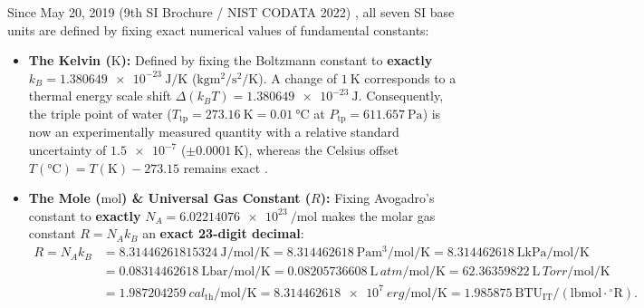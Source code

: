 Since May 20, 2019 (9th SI Brochure / NIST CODATA 2022) , all seven SI base units are defined by fixing exact numerical values of fundamental constants:
\begin{itemize}
  \item \textbf{The Kelvin ($\si{\kelvin}$):} Defined by fixing the Boltzmann constant to \textbf{exactly} $k_B = \SI{1.380649e-23}{\joule\per\kelvin}$ ($\si{\kilogram\square\meter\per\square\second\per\kelvin}$). A change of $\SI{1}{\kelvin}$ corresponds to a thermal energy scale shift $\Delta(k_B T) = \SI{1.380649e-23}{\joule}$. Consequently, the triple point of water ($T_{\mathrm{tp}} = \SI{273.16}{\kelvin} = \SI{0.01}{\celsius}$ at $P_{\mathrm{tp}} = \SI{611.657}{\pascal}$) is now an experimentally measured quantity with a relative standard uncertainty of $\num{1.5e-7}$ ($\pm\SI{0.0001}{\kelvin}$), whereas the Celsius offset $T(\si{\celsius}) = T(\si{\kelvin}) - 273.15$ remains exact .
  \item \textbf{The Mole ($\si{\mole}$) \& Universal Gas Constant ($R$):} Fixing Avogadro's constant to \textbf{exactly} $N_A = \SI{6.02214076e23}{\per\mole}$ makes the molar gas constant $R = N_A k_B$ an \textbf{exact 23-digit decimal}:
  \begin{equation}\label{eq:02:Rforms}
  \begin{aligned}
    R = N_A k_B &= \SI{8.31446261815324}{\joule\per\mole\per\kelvin} = \SI{8.314462618}{\pascal\cubic\meter\per\mole\per\kelvin} = \SI{8.314462618}{\liter\kilo\pascal\per\mole\per\kelvin} \\
      &= \SI{0.08314462618}{\liter\bar\per\mole\per\kelvin} = \SI{0.08205736608}{\liter\,atm\per\mole\per\kelvin} = \SI{62.36359822}{\liter\,Torr\per\mole\per\kelvin} \\
      &= \SI{1.987204259}{cal_{\mathrm{th}}\per\mole\per\kelvin} = \SI{8.314462618e7}{erg\per\mole\per\kelvin} = \num{1.985875}\ \mathrm{BTU_{IT}/(lbmol\cdot{^\circ R})}.
  \end{aligned}
  \end{equation}
\end{itemize}


